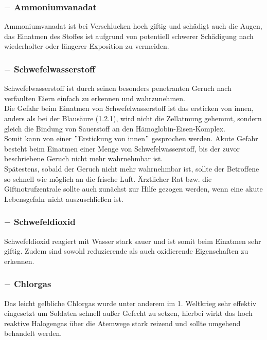 \documentclass{article}
\begin{document}
\subsubsection{ $-$ Ammoniumvanadat}
Ammoniumvanadat ist bei Verschlucken hoch giftig und schädigt auch die Augen, das Einatmen des Stoffes ist aufgrund von potentiell schwerer Schädigung nach wiederholter oder längerer Exposition zu vermeiden.\\

\subsubsection{ $-$ Schwefelwasserstoff}
Schwefelwasserstoff ist durch seinen besonders penetranten Geruch nach verfaulten Eiern einfach zu erkennen und wahrzunehmen.\\
Die Gefahr beim Einatmen von Schwefelwasserstoff ist das ersticken von innen, anders als bei der Blausäure (1.2.1), wird nicht die Zellatmung gehemmt, sondern gleich die Bindung von Sauerstoff an den Hämoglobin-Eisen-Komplex.\\
Somit kann von einer $"$Erstickung von innen$"$ gesprochen werden. Akute Gefahr besteht beim Einatmen einer Menge von Schwefelwasserstoff, bis der zuvor beschriebene Geruch nicht mehr wahrnehmbar ist.\\
Spätestens, sobald der Geruch nicht mehr wahrnehmbar ist, sollte der Betroffene so schnell wie möglich an die frische Luft. Ärztlicher Rat bzw. die Giftnotrufzentrale sollte auch zunächst zur Hilfe gezogen werden, wenn eine akute Lebensgefahr nicht auszuschließen ist.\\

\subsubsection{ $-$ Schwefeldioxid}
Schwefeldioxid reagiert mit Wasser stark sauer und ist somit beim Einatmen sehr giftig. Zudem sind sowohl reduzierende als auch oxidierende Eigenschaften zu erkennen.\\

\subsubsection{ $-$ Chlorgas}
Das leicht gelbliche Chlorgas wurde unter anderem im 1. Weltkrieg sehr effektiv eingesetzt um Soldaten schnell außer Gefecht zu setzen, hierbei wirkt das hoch reaktive Halogengas über die Atemwege stark reizend und sollte umgehend behandelt werden.\\
\end{document}
